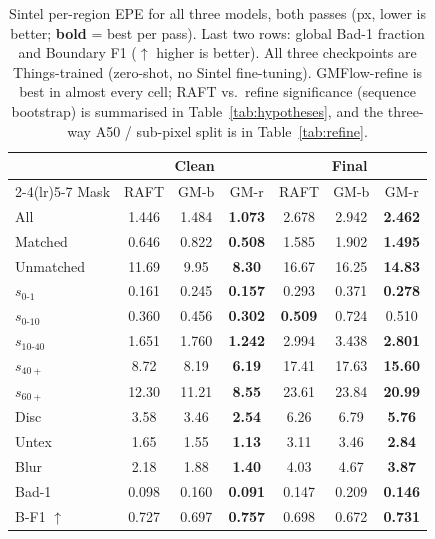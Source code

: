 \documentclass[11pt,a4paper]{article}
\begin{document}
\begin{table}[htbp]
\centering
\caption{Sintel per-region EPE for all three models, both passes
  (px, lower is better; \textbf{bold} = best per pass).  Last two rows:
  global Bad-1 fraction and Boundary F1 ($\uparrow$ higher is better).
  All three checkpoints are Things-trained (zero-shot, no Sintel
  fine-tuning).  GMFlow-refine is best in almost every cell; RAFT vs.\
  refine significance (sequence bootstrap) is summarised in
  Table~\ref{tab:hypotheses}, and the three-way A50 / sub-pixel split is
  in Table~\ref{tab:refine}.}
\label{tab:sintel_main}
\small
\setlength{\tabcolsep}{4pt}
\begin{tabular}{lcccccc}
\toprule
 & \multicolumn{3}{c}{\textbf{Clean}} & \multicolumn{3}{c}{\textbf{Final}} \\
\cmidrule(lr){2-4}\cmidrule(lr){5-7}
Mask & RAFT & GM-b & GM-r & RAFT & GM-b & GM-r \\
\midrule
All       & 1.446 & 1.484 & \textbf{1.073} & 2.678 & 2.942 & \textbf{2.462} \\
Matched   & 0.646 & 0.822 & \textbf{0.508} & 1.585 & 1.902 & \textbf{1.495} \\
Unmatched & 11.69 & 9.95  & \textbf{8.30}  & 16.67 & 16.25 & \textbf{14.83} \\
$s_{0\text{-}1}$   & 0.161 & 0.245 & \textbf{0.157} & 0.293 & 0.371 & \textbf{0.278} \\
$s_{0\text{-}10}$  & 0.360 & 0.456 & \textbf{0.302} & \textbf{0.509} & 0.724 & 0.510 \\
$s_{10\text{-}40}$ & 1.651 & 1.760 & \textbf{1.242} & 2.994 & 3.438 & \textbf{2.801} \\
$s_{40+}$ & 8.72  & 8.19  & \textbf{6.19}  & 17.41 & 17.63 & \textbf{15.60} \\
$s_{60+}$ & 12.30 & 11.21 & \textbf{8.55}  & 23.61 & 23.84 & \textbf{20.99} \\
Disc      & 3.58  & 3.46  & \textbf{2.54}  & 6.26  & 6.79  & \textbf{5.76} \\
Untex     & 1.65  & 1.55  & \textbf{1.13}  & 3.11  & 3.46  & \textbf{2.84} \\
Blur      & 2.18  & 1.88  & \textbf{1.40}  & 4.03  & 4.67  & \textbf{3.87} \\
\midrule
Bad-1            & 0.098 & 0.160 & \textbf{0.091} & 0.147 & 0.209 & \textbf{0.146} \\
B-F1 $\uparrow$  & 0.727 & 0.697 & \textbf{0.757} & 0.698 & 0.672 & \textbf{0.731} \\
\bottomrule
\end{tabular}
\end{table}
\end{document}
